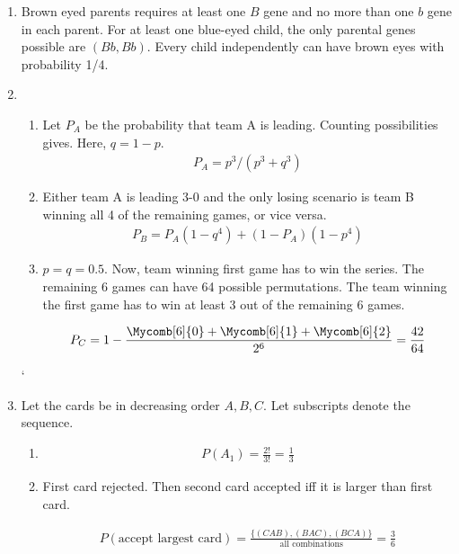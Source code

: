 \begin{enumerate}
	
	\item Brown eyed parents requires at least one $ B $ gene and no more than one $ b $ gene in each parent. For at least one blue-eyed child, the only parental genes possible are $ (Bb, Bb) $.
	Every child independently can have brown eyes with probability 1/4.
	
	\item \begin{enumerate}
		\item Let $ P_A $ be the probability that team A is leading. Counting possibilities gives.
		Here, $ q = 1-p $. 
		\begin{align}
			P_A = p^3 / (p^3 + q^3)
		\end{align}
		
		\item Either team A is leading 3-0 and the only losing scenario is team B winning all 4 of the remaining games, or vice versa. 
		\begin{align}
			P_B = P_A (1 - q^4) + (1 - P_A)(1 - p^4)
		\end{align}
		
		\item $ p = q = 0.5 $. Now, team winning first game has to win the series.
		The remaining 6 games can have 64 possible permutations. The team winning the first game has to win at least 3 out of the remaining 6 games. 
		
		\begin{align}
			P_C = 1 - \frac{\Mycomb[6]{0} + \Mycomb[6]{1} + \Mycomb[6]{2} }{2^6} = \frac{42}{64}
		\end{align}
		
	\end{enumerate}
	
	`	\item Let the cards be in decreasing order $ A, B, C $. Let subscripts denote the sequence.
	\begin{enumerate}
		\item \begin{align}
			P(A_1) = \frac{2!}{3!} = \frac{1}{3}
		\end{align}
		
		\item First card rejected. Then second card accepted iff it is larger than first card.
		
			\begin{align}
				P(\text{accept largest card}) = \frac{\{(CAB), (BAC), (BCA)\}}{\text{all combinations}} = \frac{3}{6}
			\end{align}
		

\end{enumerate}
\end{enumerate}
